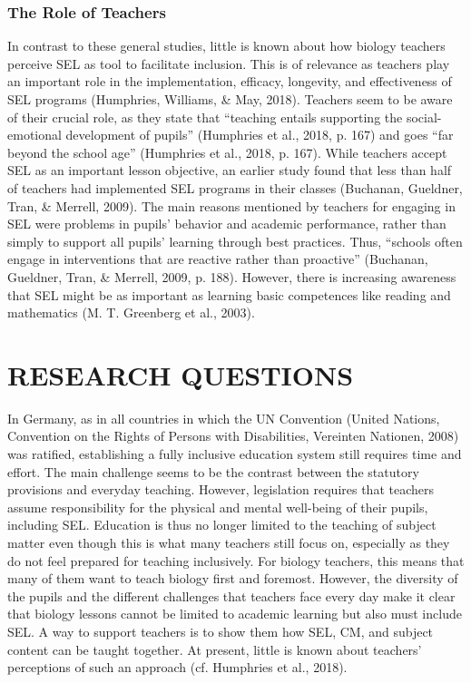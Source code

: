 \documentclass[11.5pt]{sig-alternate} %
\begin{document}
\begin{large}
\subsubsection*{The Role of Teachers} 

In contrast to these general studies, little is known about how biology teachers perceive SEL as tool to facilitate inclusion. This is of relevance as teachers play an important role in the implementation, efficacy, longevity, and effectiveness of SEL programs (Humphries, Williams, \& May, 2018). Teachers seem to be aware of their crucial role, as they state that “teaching entails supporting the social-emotional development of pupils” (Humphries et al., 2018, p. 167) and goes “far beyond the school age” (Humphries et al., 2018, p. 167). While teachers accept SEL as an important lesson objective, an earlier study found that less than half of teachers had implemented SEL programs in their classes (Buchanan, Gueldner, Tran, \& Merrell, 2009). The main reasons mentioned by teachers for engaging in SEL were problems in pupils’ behavior and academic performance, rather than simply to support all pupils’ learning through best practices. Thus, “schools often engage in interventions that are reactive rather than proactive” (Buchanan, Gueldner, Tran, \& Merrell, 2009, p. 188). However, there is increasing awareness that SEL might be as important as learning basic competences like reading and mathematics (M. T. Greenberg et al., 2003).

\section*{RESEARCH QUESTIONS}

In Germany, as in all countries in which the UN Convention (United Nations, Convention on the Rights of Persons with Disabilities, Vereinten Nationen, 2008) was ratified, establishing a fully inclusive education system still requires time and effort. The main challenge seems to be the contrast between the statutory provisions and everyday teaching. However, legislation requires that teachers assume responsibility for the physical and mental well-being of their pupils, including SEL. Education is thus no longer limited to the teaching of subject matter even though this is what many teachers still focus on, especially as they do not feel prepared for teaching inclusively. For biology teachers, this means that many of them want to teach biology first and foremost. However, the diversity of the pupils and the different challenges that teachers face every day make it clear that biology lessons cannot be limited to academic learning but also must include SEL. A way to support teachers is to show them how SEL, CM, and subject content can be taught together. At present, little is known about teachers’ perceptions of such an approach (cf. Humphries et al., 2018).


\end{large}
\end{document}
